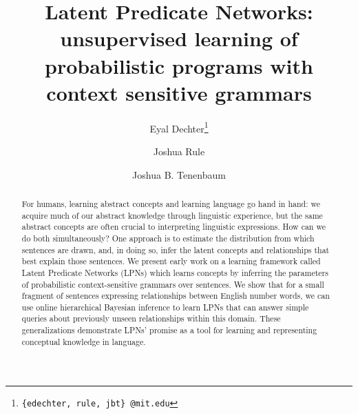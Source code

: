 \documentclass{article} %
\title{Latent Predicate Networks: unsupervised learning of  probabilistic programs with context sensitive grammars}
\author{Eyal Dechter\thanks{{\tt \{edechter, rule, jbt\} @mit.edu}}}
\author{Joshua Rule}
\author{Joshua B. Tenenbaum}
\affil{{\normalsize Department of Brain and Cognitive Sciences, MIT}}
\date{}
\begin{document}
\maketitle

\begin{abstract}
  
  For humans, learning abstract concepts and learning language go hand
  in hand: we acquire much of our abstract knowledge through
  linguistic experience, but the same abstract concepts are often
  crucial to interpreting linguistic expressions. How can we do both
  simultaneously? One approach is to estimate the distribution from
  which sentences are drawn, and, in doing so, infer the latent
  concepts and relationships that best explain those sentences. We
  present early work on a learning framework called Latent Predicate
  Networks (LPNs) which learns concepts by inferring the parameters of
  probabilistic context-sensitive grammars over sentences.  We show
  that for a small fragment of sentences expressing relationships
  between English number words, we can use online hierarchical Bayesian
  inference to learn LPNs that can answer simple queries about
  previously unseen relationships within this domain. These
  generalizations demonstrate LPNs' promise as a tool for learning and
  representing conceptual knowledge in language.
\end{abstract}
\end{document}
